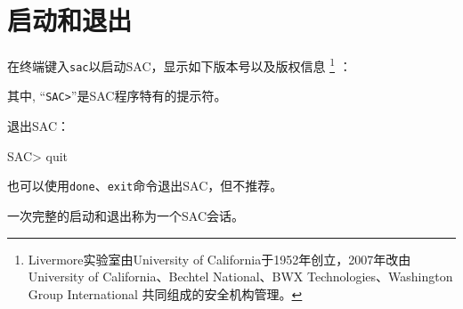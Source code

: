 \section{启动和退出}
在终端键入\lstinline{sac}以启动SAC，显示如下版本号以及版权信息
\footnote{Livermore实验室由University of California于1952年创立，2007年改由
University of California、Bechtel National、BWX Technologies、Washington Group International
共同组成的安全机构管理。}
：
其中, ``\lstinline{SAC>}''是SAC程序特有的提示符。

退出SAC：
\begin{SACCode}
SAC> quit
\end{SACCode}
也可以使用\lstinline{done}、\lstinline{exit}命令退出SAC，但不推荐。

一次完整的启动和退出称为一个SAC会话。
